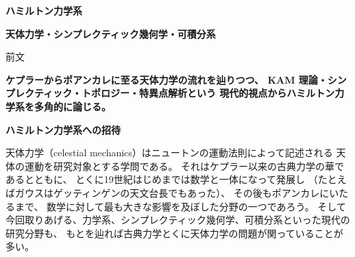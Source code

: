 \documentclass[uplatex,dvipdfmx]{jlreq}
\begin{document}
\begin{center}
  \vspace*{20pt}
  {\Huge\bfseries ハミルトン力学系}

  \vspace{30pt}

  {\Large\bfseries 天体力学・シンプレクティック幾何学・可積分系}

  \vspace{50pt}

  {\large 前文}

  \vspace{10pt}

  \parbox{0.85\textwidth}{
    \large\bfseries
    ケプラーからポアンカレに至る天体力学の流れを辿りつつ、
    KAM 理論・シンプレクティック・トポロジー・特異点解析という
    現代的視点からハミルトン力学系を多角的に論じる。
  }
\end{center}

\vfill

\newpage

\noindent
{\large\bfseries ハミルトン力学系への招待}

\medskip
\hspace*{\fill}{\large\bfseries 伊藤 秀一（東工大・理）}

\bigskip\bigskip

天体力学（celestial mechanics）はニュートンの運動法則によって記述される
天体の運動を研究対象とする学問である。
それはケプラー以来の古典力学の華であるとともに、
とくに19世紀はじめまでは数学と一体になって発展し
（たとえばガウスはゲッティンゲンの天文台長でもあった）、
その後もポアンカレにいたるまで、
数学に対して最も大きな影響を及ぼした分野の一つであろう。
そして今回取りあげる、力学系、シンプレクティック幾何学、可積分系といった現代の研究分野も、
もとを辿れば古典力学とくに天体力学の問題が関っていることが多い。
\end{document}
